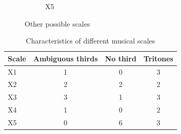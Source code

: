 \documentclass[]{report}
\begin{document}
\begin{figure}[H]
\begin{subfigure}{0.15\textwidth}
\begin{tikzpicture}
		\end{tikzpicture}
		\caption{\textsf{X5}}

	\end{subfigure}
	\hfill
	\caption{Other possible scales}\label{fig:more-posible-scales}
\end{figure}
\begin{table}[H]
\centering
\begin{tabular}{lccc}
\toprule
Scale & Ambiguous thirds & No third & Tritones \\
\midrule
X1 & 1 & 0 & 3 \\
X2 & 2 & 2 & 2 \\
X3 & 3 & 1 & 3 \\
X4 & 1 & 0 & 2 \\
X5 & 0 & 6 & 3 \\
\bottomrule
\end{tabular}
\caption{Characteristics of different musical scales}\label{tab:escalas}
\end{table}
\end{document}
